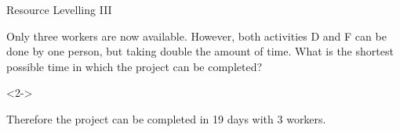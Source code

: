 \documentclass[8pt]{beamer}
\begin{document}
\begin{frame}{Resource Levelling III}
	\begin{problem}
		Only three workers are now available. However, both activities D and F can be done by one person, but taking double the amount of time. What is the shortest possible time in which the project can be completed?
	\end{problem}
	\begin{solution}<2->
		

	\centering




		\begin{center}
\end{center}

Therefore the project can be completed in 19 days with 3 workers.
	\end{solution}
\end{frame}
\end{document}
